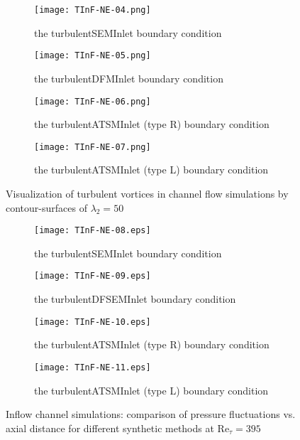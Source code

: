 \begin{figure}[H]
\centering
    \begin{subfigure}[b]{0.6\linewidth}
        \texttt{[image: TInF-NE-04.png]} \label{SEMlambda}
        \caption{the turbulentSEMInlet boundary condition}
     \end{subfigure}
    \begin{subfigure}[b]{0.6\linewidth}
        \texttt{[image: TInF-NE-05.png]}
        \caption{the turbulentDFMInlet boundary condition} \label{DFMlambda}
    \end{subfigure}
     \begin{subfigure}[b]{0.6\linewidth}
        \texttt{[image: TInF-NE-06.png]}
        \caption{the turbulentATSMInlet (type R) boundary condition} \label{ATSMRlambda}
    \end{subfigure}
    \begin{subfigure}[b]{0.6\linewidth}
        \texttt{[image: TInF-NE-07.png]}
        \caption{the turbulentATSMInlet (type L) boundary condition} \label{ATSMLlambda}
    \end{subfigure}
      \caption{Visualization of turbulent vortices in channel flow simulations by contour-surfaces of $\lambda_2 = 50$} \label{lambda2}
\end{figure}

\begin{figure}[H]
\centering
    \begin{subfigure}[b]{0.7\linewidth}
        \texttt{[image: TInF-NE-08.eps]}
        \caption{the turbulentSEMInlet boundary condition}
     \end{subfigure}
     \begin{subfigure}[b]{0.7\linewidth}
        \texttt{[image: TInF-NE-09.eps]}
        \caption{the turbulentDFSEMInlet boundary condition}
    \end{subfigure}
    \begin{subfigure}[b]{0.7\linewidth}
        \texttt{[image: TInF-NE-10.eps]}
        \caption{the turbulentATSMInlet (type R) boundary condition}
    \end{subfigure}
    \begin{subfigure}[b]{0.7\linewidth}
        \texttt{[image: TInF-NE-11.eps]}
        \caption{the turbulentATSMInlet (type L) boundary condition}
    \end{subfigure}
      \caption{Inflow channel simulations: comparison of pressure fluctuations vs. axial distance for different synthetic methods at $\mathrm{Re}_{\tau} = 395$}\label{pressure}
\end{figure}

